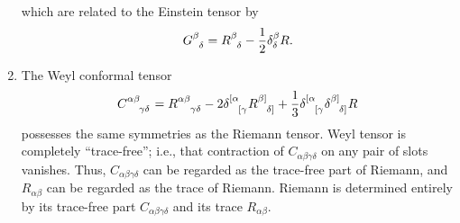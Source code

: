 \begin{enumerate}
which are related to the Einstein tensor by 
\[\tensor{G}{^{\beta}_{\delta}} =  \tensor{R}{^{\beta}_{\delta}} - \frac{1}{2} \delta^{\beta}_{\delta}R.\]
\item The Weyl conformal tensor
\[\tensor{C}{^{\alpha \beta}_{ \gamma \delta}} = \tensor{R}{^{\alpha \beta}_{\gamma \delta}} -2 \tensor{\delta}{^{[\alpha}_{[\gamma}} \tensor{R}{^{\beta]}_{\delta]}} + \frac{1}{3} \tensor{\delta}{^{[\alpha}_{[\gamma}} \tensor{\delta}{^{\beta]}_{\delta]}} R \]
possesses the same symmetries as the Riemann tensor. 
Weyl tensor is completely ``trace-free''; i.e., that
contraction of $C_{\alpha \beta \gamma \delta}$ on any pair of slots vanishes. Thus, $C_{\alpha \beta \gamma \delta}$ can be regarded as the trace-free part of Riemann, and $R_{\alpha \beta}$ can be regarded as the trace of Riemann. Riemann is determined entirely by its trace-free part $C_{\alpha \beta \gamma \delta}$ and
its trace $R_{\alpha \beta}$.
\end{enumerate}

